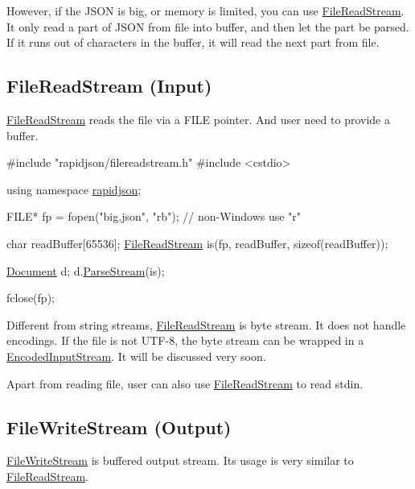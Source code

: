 However, if the J\+S\+ON is big, or memory is limited, you can use {\ttfamily \hyperlink{class_file_read_stream}{File\+Read\+Stream}}. It only read a part of J\+S\+ON from file into buffer, and then let the part be parsed. If it runs out of characters in the buffer, it will read the next part from file.\hypertarget{md_Commun_Externe_RapidJSON_doc_stream.zh-cn_FileReadStream}{}\subsection{File\+Read\+Stream (\+Input)}\label{md_Commun_Externe_RapidJSON_doc_stream.zh-cn_FileReadStream}
{\ttfamily \hyperlink{class_file_read_stream}{File\+Read\+Stream}} reads the file via a {\ttfamily F\+I\+LE} pointer. And user need to provide a buffer.


\begin{DoxyCode}
\textcolor{preprocessor}{#include "rapidjson/filereadstream.h"}
\textcolor{preprocessor}{#include <cstdio>}

\textcolor{keyword}{using namespace }\hyperlink{namespacerapidjson}{rapidjson};

FILE* fp = fopen(\textcolor{stringliteral}{"big.json"}, \textcolor{stringliteral}{"rb"}); \textcolor{comment}{// non-Windows use "r"}

\textcolor{keywordtype}{char} readBuffer[65536];
\hyperlink{class_file_read_stream}{FileReadStream} is(fp, readBuffer, \textcolor{keyword}{sizeof}(readBuffer));

\hyperlink{class_generic_document}{Document} d;
d.\hyperlink{class_generic_document_afe94c0abc83a20f2d7dc1ba7677e6238}{ParseStream}(is);

fclose(fp);
\end{DoxyCode}


Different from string streams, {\ttfamily \hyperlink{class_file_read_stream}{File\+Read\+Stream}} is byte stream. It does not handle encodings. If the file is not U\+T\+F-\/8, the byte stream can be wrapped in a {\ttfamily \hyperlink{class_encoded_input_stream}{Encoded\+Input\+Stream}}. It will be discussed very soon.

Apart from reading file, user can also use {\ttfamily \hyperlink{class_file_read_stream}{File\+Read\+Stream}} to read {\ttfamily stdin}.\hypertarget{md_Commun_Externe_RapidJSON_doc_stream.zh-cn_FileWriteStream}{}\subsection{File\+Write\+Stream (\+Output)}\label{md_Commun_Externe_RapidJSON_doc_stream.zh-cn_FileWriteStream}
{\ttfamily \hyperlink{class_file_write_stream}{File\+Write\+Stream}} is buffered output stream. Its usage is very similar to {\ttfamily \hyperlink{class_file_read_stream}{File\+Read\+Stream}}.


